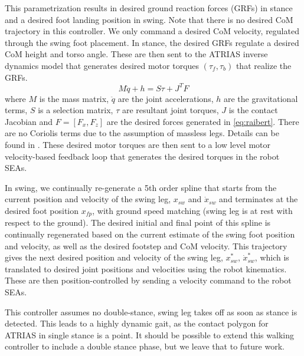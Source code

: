 This parametrization results in desired ground reaction forces (GRFs) in stance and a desired foot landing position in swing. Note that there is no desired CoM trajectory in this controller. We only command a desired CoM velocity, regulated through the swing foot placement. In stance, the desired GRFs regulate a desired CoM height and torso angle. These are then sent to the ATRIAS inverse dynamics model that generates desired motor torques $(\tau_f, \tau_b)$ that realize the GRFs. 
\begin{equation}
    M \ddot{q} + h = S \tau + J^T F
\end{equation}
where $M$ is the mass matrix, $\ddot{q}$ are the joint accelerations, $h$ are the gravitational terms, $S$ is a selection matrix, $\tau$ are resultant joint torques, $J$ is the contact Jacobian and $F = [F_x, F_z]$ are the desired forces generated in \ref{eq:raibert}. There are no Coriolis terms due to the assumption of massless legs. Details can be found in \cite{wu2014highly}. These desired motor torques are then sent to a low level motor velocity-based feedback loop that generates the desired torques in the robot SEAs. %

In swing, we continually re-generate a 5th order spline that starts from the current position and velocity of the swing leg, $x_{sw}$ and $\dot{x}_{sw}$ and terminates at the desired foot position $x_{fp}$, with ground speed matching (swing leg is at rest with respect to the ground). The desired initial and final point of this spline is continually regenerated based on the current estimate of the swing foot position and velocity, as well as the desired footstep and CoM velocity. This trajectory gives the next desired position and velocity of the swing leg, $x_{sw}^*$, $\dot{x}_{sw}^*$, which is translated to desired joint positions and velocities using the robot kinematics. These are then position-controlled by sending a velocity command to the robot SEAs. %


This controller assumes no double-stance, swing leg takes off as soon as stance is detected. This leads to a highly dynamic gait, as the contact polygon for ATRIAS in single stance is a point. It should be possible to extend this walking controller to include a double stance phase, but we leave that to future work. 


